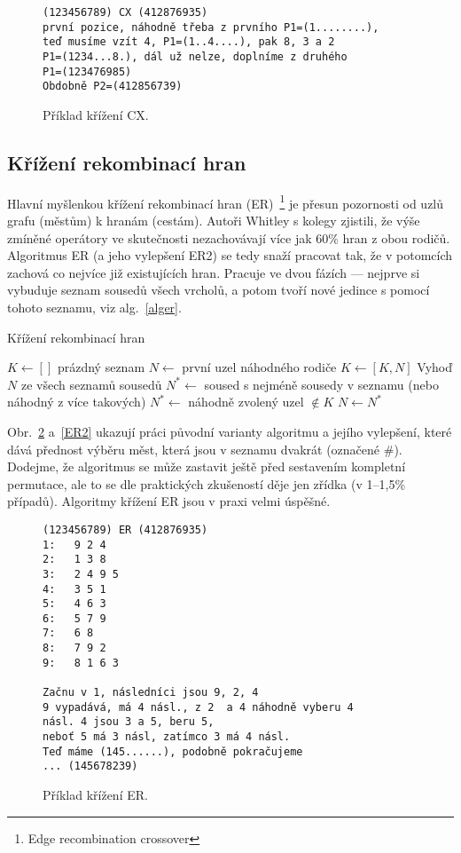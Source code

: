 \begin{figure}%
\begin{verbatim}
(123456789) CX (412876935)
první pozice, náhodně třeba z prvního P1=(1........), 
teď musíme vzít 4, P1=(1..4....), pak 8, 3 a 2
P1=(1234...8.), dál už nelze, doplníme z druhého
P1=(123476985)
Obdobně P2=(412856739)
\end{verbatim}
\caption{Příklad křížení CX.}%
\label{CX}%
\end{figure}


\subsection{Křížení rekombinací hran}

Hlavní myšlenkou křížení rekombinací hran (ER)~\footnote{Edge recombination crossover} je přesun pozornosti od uzlů grafu (městům) k hranám (cestám). Autoři Whitley s kolegy zjistili, že výše zmíněné operátory ve skutečnosti nezachovávají více jak 60\% hran z obou rodičů. Algoritmus ER (a jeho vylepšení ER2) se tedy snaží pracovat tak, že v potomcích zachová co nejvíce již existujících hran. Pracuje ve dvou fázích --- nejprve si vybuduje seznam sousedů všech vrcholů, a potom tvoří nové jedince s pomocí tohoto seznamu, viz alg.~\ref{alger}.

\begin{algorithm}
\caption{Křížení rekombinací hran}
\label{alger}
\begin{algorithmic}
\State $K \gets []$ prázdný seznam
\State $N \gets $ první uzel náhodného rodiče
\State $K \gets [K,N]$ 
\State Vyhoď $N$ ze všech seznamů sousedů
\State 	$N^* \gets$ soused s nejméně sousedy v seznamu (nebo náhodný z více takových)
\Else 
\State 	$N^* \gets$ náhodně zvolený uzel $\notin K$
\EndIf
\State 	$N \gets N^*$
\EndWhile
\EndProcedure
\end{algorithmic}
\end{algorithm}


Obr.~\ref{ER} a~\ref{ER2} ukazují práci původní varianty algoritmu a jejího vylepšení, které dává přednost výběru měst, která jsou v seznamu dvakrát (označené \#). Dodejme, že algoritmus se může zastavit ještě před sestavením kompletní permutace, ale to se dle praktických zkušeností děje jen zřídka (v 1--1,5\% případů). Algoritmy křížení ER jsou v praxi velmi úspěšné. 

\begin{figure}%
\begin{verbatim}
(123456789) ER (412876935)
1:   9 2 4
2:   1 3 8
3:   2 4 9 5
4:   3 5 1
5:   4 6 3
6:   5 7 9
7:   6 8
8:   7 9 2
9:   8 1 6 3

Začnu v 1, následníci jsou 9, 2, 4
9 vypadává, má 4 násl., z 2  a 4 náhodně vyberu 4
násl. 4 jsou 3 a 5, beru 5, 
neboť 5 má 3 násl, zatímco 3 má 4 násl. 
Teď máme (145......), podobně pokračujeme
... (145678239)
\end{verbatim}
\caption{Příklad křížení ER.}%
\label{ER}%
\end{figure}

